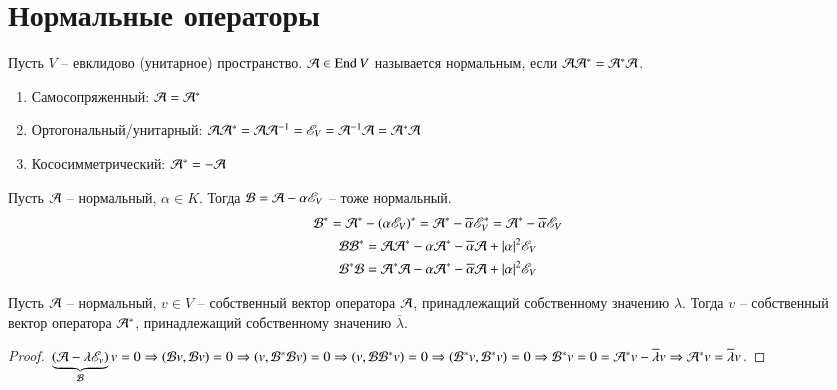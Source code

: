 \documentclass[main]{subfiles}
\begin{document}
\chapter{Нормальные операторы}

\begin{definition} 
    Пусть $V$ -- евклидово (унитарное) пространство. $\mathcal{A} \in \operatorname{End} V$ называется нормальным, если
    $\mathcal{A} \mathcal{A}^* = \mathcal{A}^* \mathcal{A}$.
    \begin{enumerate}
        \item Самосопряженный: $\mathcal{A} = \mathcal{A}^*$
        \item Ортогональный/унитарный: $\mathcal{A} \mathcal{A}^* = \mathcal{A} \mathcal{A}^{-1} =\mathscr{E}_V = \mathcal{A}^{-1} \mathcal{A} = \mathcal{A}^* \mathcal{A}$
        \item Кососимметрический: $\mathcal{A}^* = -\mathcal{A}$
    \end{enumerate}
\end{definition}

\begin{proposition}
    Пусть $\mathcal{A}$ -- нормальный, $\alpha \in K$. Тогда $\mathcal{B} = \mathcal{A} - \alpha \mathscr{E}_V$ -- тоже нормальный.
    \begin{gather*}
        \mathcal{B}^* = \mathcal{A}^* - (\alpha \mathscr{E}_V)^* = \mathcal{A}^* - \overline{\alpha}\mathscr{E}_V^* = \mathcal{A}^* - \overline{\alpha}\mathscr{E}_V \\
        \mathcal{B} \mathcal{B}^* = \mathcal{A} \mathcal{A}^* - \alpha\mathcal{A}^* - \overline{\alpha}\mathcal{A} + |\alpha|^2\mathscr{E}_V \\
        \mathcal{B}^* \mathcal{B} = \mathcal{A}^* \mathcal{A} - \alpha \mathcal{A}^* - \overline{\alpha}\mathcal{A} + |\alpha|^2\mathscr{E}_V 
    \end{gather*}
\end{proposition}

\begin{proposition}
    Пусть $\mathcal{A}$ -- нормальный, $v \in V$ -- собственный вектор оператора $\mathcal{A}$, принадлежащий собственному значению $\lambda$. Тогда $v$ -- собственный вектор оператора $\mathcal{A}^*$, принадлежащий собственному значению $\overline{\lambda}$.
\end{proposition}

\begin{proof}
    $\underbrace{(\mathcal{A} - \lambda \mathscr{E}_v)}_{\mathcal{B}} v = 0 \Rightarrow (\mathcal{B} v, \mathcal{B} v) = 0 \Rightarrow
        (v, \mathcal{B}^* \mathcal{B} v) = 0 \Rightarrow (v, \mathcal{B} \mathcal{B}^* v) = 0 \Rightarrow (\mathcal{B}^* v, \mathcal{B}^* v) = 0 \Rightarrow \mathcal{B}^*v = 0 = \mathcal{A}^* v - \overline{\lambda}v \Rightarrow \mathcal{A}^*v = \overline{\lambda}v$.
\end{proof}
\end{document}
